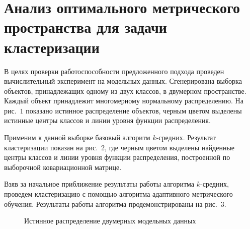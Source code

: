 \section{Анализ оптимального метрического пространства для задачи кластеризации}
В целях проверки работоспособности предложенного подхода проведен вычислительный эксперимент на модельных данных. Сгенерирована выборка объектов, принадлежащих одному из двух классов, в двумерном пространстве.
Каждый объект принадлежит многомерному нормальному распределению.
На рис.~$1$ показано истинное распределение объектов, черным цветом выделены истинные центры классов и линии уровня функции распределения.


Применим к данной выборке базовый алгоритм $k$-средних.
Результат кластеризации показан на рис.~2, где черным цветом выделены найденные центры классов и линии уровня функции распределения, построенной по выборочной ковариационной матрице.

Взяв за начальное приближение результаты работы алгоритма $k$-средних,
проведем клас\-те\-ри\-за\-цию с помощью алгоритма адаптивного метрического обучения.
Результаты работы алгоритма продемонстрированы на рис.~$3$.
\begin{figure}[ht]
    \caption{Истинное распределение двумерных модельных данных}
\end{figure}

